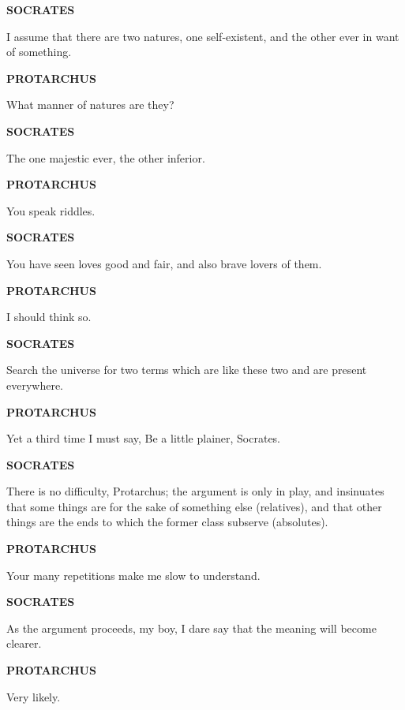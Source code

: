 \documentclass[11pt,letter]{article}
\begin{document}
\par \textbf{SOCRATES}
\par   I assume that there are two natures, one self-existent, and the other ever in want of something.

\par \textbf{PROTARCHUS}
\par   What manner of natures are they?

\par \textbf{SOCRATES}
\par   The one majestic ever, the other inferior.

\par \textbf{PROTARCHUS}
\par   You speak riddles.

\par \textbf{SOCRATES}
\par   You have seen loves good and fair, and also brave lovers of them.

\par \textbf{PROTARCHUS}
\par   I should think so.

\par \textbf{SOCRATES}
\par   Search the universe for two terms which are like these two and are present everywhere.

\par \textbf{PROTARCHUS}
\par   Yet a third time I must say, Be a little plainer, Socrates.

\par \textbf{SOCRATES}
\par   There is no difficulty, Protarchus; the argument is only in play, and insinuates that some things are for the sake of something else (relatives), and that other things are the ends to which the former class subserve (absolutes).

\par \textbf{PROTARCHUS}
\par   Your many repetitions make me slow to understand.

\par \textbf{SOCRATES}
\par   As the argument proceeds, my boy, I dare say that the meaning will become clearer.

\par \textbf{PROTARCHUS}
\par   Very likely.
\end{document}
